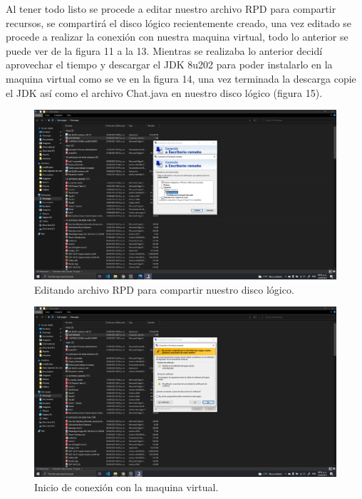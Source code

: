 \documentclass[11pt]{article}
\begin{document}
Al tener todo listo se procede a editar nuestro archivo RPD para compartir recursos, se compartirá el disco lógico recientemente creado, una vez editado se procede a realizar la conexión con nuestra maquina virtual, todo lo anterior se puede ver de la figura 11 a la 13. Mientras se realizaba lo anterior decidí aprovechar el tiempo y descargar el JDK 8u202 para poder instalarlo en la maquina virtual como se ve en la figura 14, una vez terminada la descarga copie el JDK así como el archivo Chat.java en nuestro disco lógico (figura 15).
		\begin{figure}[H]
			\centering
			\includegraphics[scale=0.34]{resources/recursoscompartidos.png}
			\caption{Editando archivo RPD para compartir nuestro disco lógico.}\label{fig:picture}
		\end{figure}
		\begin{figure}[H]
			\centering
			\includegraphics[scale=0.34]{resources/inicioconexion.png}
			\caption{Inicio de conexión con la maquina virtual.}\label{fig:picture}
		\end{figure}
\end{document}
